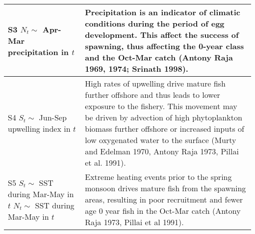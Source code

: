 \begin{table}
\begin{tabular}[t]{>{\raggedright\arraybackslash}p{5.5cm}|>{\raggedright\arraybackslash}p{10cm}}
\hline
S3 \newline $N_t \sim$ Apr-Mar precipitation in $t$ & Precipitation is an indicator of climatic conditions during the period of egg development. This affect the success of spawning, thus affecting the 0-year class and the Oct-Mar catch (Antony Raja 1969, 1974; Srinath 1998).\\
\hline
S4 \newline $S_t \sim$ Jun-Sep upwelling index in $t$ & High rates of upwelling drive mature fish further offshore and thus leads to lower exposure to the fishery.  This movement may be driven by advection of high phytoplankton biomass further offshore or increased inputs of low oxygenated water to the surface (Murty and Edelman 1970, Antony Raja 1973, Pillai et al. 1991).\\
\hline
S5 \newline $S_t \sim$ SST during Mar-May in $t$ \newline $N_t \sim$ SST during Mar-May in $t$ & Extreme heating events prior to the spring monsoon drives mature fish from the spawning areas, resulting in poor recruitment and fewer age 0 year fish in the Oct-Mar catch (Antony Raja 1973, Pillai et al 1991).\\
\hline
\end{tabular}
\end{table}

